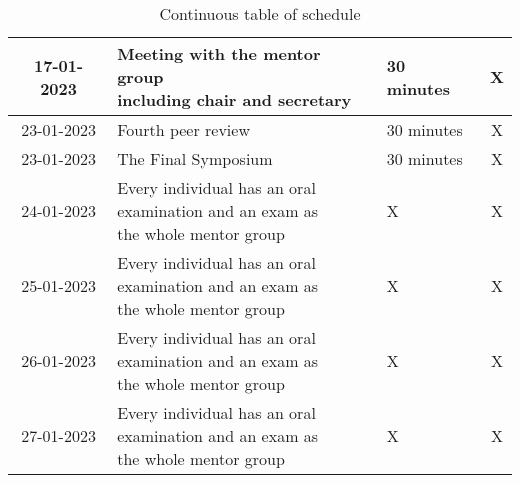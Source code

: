 \newpage
\clearpage

\begin{table}[h]
    \setlength{\arrayrulewidth}{0.5mm}
    \setlength{\tabcolsep}{17pt}
    \renewcommand{\arraystretch}{1.5}
    \centering
    \begin{tabular}{|c|l|l|c|}
         \hline
         17-01-2023 & \makecell[l]{Meeting with the mentor group \\ including chair and secretary} & 30 minutes & X \\
         \hline
         23-01-2023 & Fourth peer review & 30 minutes &  X\\
         \hline
         23-01-2023 & The Final Symposium & 30 minutes & X \\
         \hline
         24-01-2023 & \makecell[l]{Every individual has an oral \\ examination and an exam as \\ the whole mentor group} & \hspace{20pt}X & X \\
         \hline
         25-01-2023 & \makecell[l]{Every individual has an oral \\ examination and an exam as \\ the whole mentor group} & \hspace{20pt}X & X \\
         \hline
         26-01-2023 & \makecell[l]{Every individual has an oral \\ examination and an exam as \hspace{25pt} \\ the whole mentor group} & \hspace{20pt}X \hspace{15pt} & \hspace{19pt}X\hspace{19pt} \\
         \hline
         27-01-2023 & \makecell[l]{Every individual has an oral \\ examination and an exam as \\ the whole mentor group} & \hspace{20pt}X & X \\
         \hline
    \end{tabular}
    \captionsetup{justification=centering}
    \caption{Continuous table of schedule}
    \label{tab:Table schedule 4.1.3}
\end{table}
